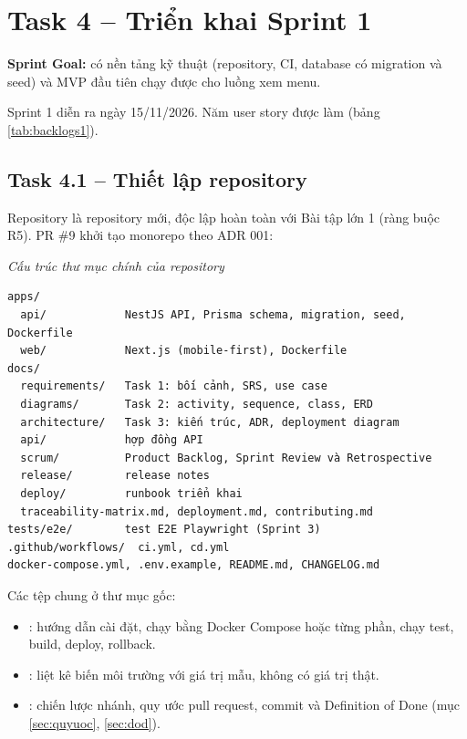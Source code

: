 \section{Task 4 -- Triển khai Sprint 1}\label{ch:sprint1}

\textbf{Sprint Goal:} có nền tảng kỹ thuật (repository, CI, database có migration và seed) và MVP đầu tiên chạy được cho luồng xem menu.

Sprint 1 diễn ra ngày 15/11/2026. Năm user story được làm (bảng \ref{tab:backlogs1}).



\subsection{Task 4.1 -- Thiết lập repository}
Repository  là repository mới, độc lập hoàn toàn với Bài tập lớn 1 (ràng buộc R5). PR \#9 khởi tạo monorepo theo ADR 001:

\noindent\textit{Cấu trúc thư mục chính của repository}
\begin{Verbatim}
apps/
  api/            NestJS API, Prisma schema, migration, seed, Dockerfile
  web/            Next.js (mobile-first), Dockerfile
docs/
  requirements/   Task 1: bối cảnh, SRS, use case
  diagrams/       Task 2: activity, sequence, class, ERD
  architecture/   Task 3: kiến trúc, ADR, deployment diagram
  api/            hợp đồng API
  scrum/          Product Backlog, Sprint Review và Retrospective
  release/        release notes
  deploy/         runbook triển khai
  traceability-matrix.md, deployment.md, contributing.md
tests/e2e/        test E2E Playwright (Sprint 3)
.github/workflows/  ci.yml, cd.yml
docker-compose.yml, .env.example, README.md, CHANGELOG.md
\end{Verbatim}

Các tệp chung ở thư mục gốc:
\begin{itemize}
\item {}: hướng dẫn cài đặt, chạy bằng Docker Compose hoặc từng phần, chạy test, build, deploy, rollback.
\item {}: liệt kê biến môi trường với giá trị mẫu, không có giá trị thật.
\item {}: chiến lược nhánh, quy ước pull request, commit và Definition of Done (mục \ref{sec:quyuoc}, \ref{sec:dod}).
\end{itemize}

